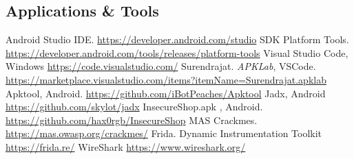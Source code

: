 \documentclass{article}
\begin{document}
\begin{thebibliography}{9}
    \section*{Applications \& Tools}
     Android Studio IDE. \url{https://developer.android.com/studio}
     SDK Platform Tools. \url{https://developer.android.com/tools/releases/platform-tools}
     Visual Studio Code, Windows \url{https://code.visualstudio.com/}
     Surendrajat. \textit{APKLab}, VSCode. \url{https://marketplace.visualstudio.com/items?itemName=Surendrajat.apklab}
     Apktool, Android. \url{https://github.com/iBotPeaches/Apktool}
     Jadx, Android \url{https://github.com/skylot/jadx}
     InsecureShop.apk , Android. \url{https://github.com/hax0rgb/InsecureShop}
     MAS Crackmes. \url{https://mas.owasp.org/crackmes/}
     Frida. Dynamic Instrumentation Toolkit \url{https://frida.re/}
     WireShark \url{https://www.wireshark.org/}
\end{thebibliography}
\end{document}
